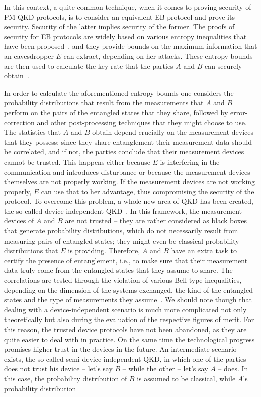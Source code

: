 In this context, a quite common technique, when it comes to proving security of PM QKD protocols, is to consider an equivalent EB protocol and prove its security. Security of the latter implies security of the former. The proofs of security for EB protocols are widely based on various entropy inequalities that have been proposed~\cite{maa:uff:88,ren:boi:09,ber:chr:col:ren:ren:10,weh:win:10,tom:ren:11,ng:ber:weh:12,col:ber:tom:weh:17}, and they provide bounds on the maximum information that an eavesdropper $E$ can extract, depending on her attacks. These entropy bounds are then used to calculate the key rate that the parties $A$ and $B$ can securely obtain~\cite{dev:win:05,tom:lim:gis:ren:12}. 

In order to calculate the aforementioned entropy bounds one considers the probability distributions that result from the measurements that $A$ and $B$ perform on the pairs of the entangled states that they share, followed by error-correction and other post-processing techniques that they might choose to use. The statistics that $A$ and $B$ obtain depend crucially on the measurement devices that they possess; since they share entanglement their measurement data should be correlated, and if not, the parties conclude that their measurement devices cannot be trusted. This happens either because $E$ is interfering in the communication and introduces disturbance or because the measurement devices themselves are not properly working. If the measurement devices are not working properly, $E$ can use that to her advantage, thus compromising the security of the protocol. To overcome this problem, a whole new area of QKD has been created, the so-called device-independent QKD~\cite{pir:aci:bru:gis:mas:sca:09,mas:pir:aci:11,vaz:vid:14,agu:ram:kof:paw:16}. In this framework, the measurement devices of $A$ and $B$ are not trusted -- they are rather considered as black boxes that generate probability distributions, which do not necessarily result from measuring pairs of entangled states; they might even be classical probability distributions that $E$ is providing. Therefore, $A$ and $B$ have an extra task to certify the presence of entanglement, i.e., to make sure that their measurement data truly come from the entangled states that they assume to share. The correlations are tested through the violation of various Bell-type inequalities, depending on the dimension of the systems exchanged, the kind of the entangled states and the type of measurements they assume~\cite{cla:hor:shi:holt:69,col:gis:lin:mas:pop:02,sal:aug:rem:tur:wit:aci:pir:17}. We should note though that dealing with a device-independent scenario is much more complicated not only theoretically but also during the evaluation of the respective figures of merit. For this reason, the trusted device protocols have not been abandoned, as they are quite easier to deal with in practice. On the same time the technological progress promises higher trust in the devices in the future. An intermediate scenario exists, the so-called semi-device-independent QKD, in which one of the parties does not trust his device -- let's say $B$ -- while the other -- let's say $A$ -- does. In this case, the probability distribution of $B$ is assumed to be classical, while $A$'s probability distribution 